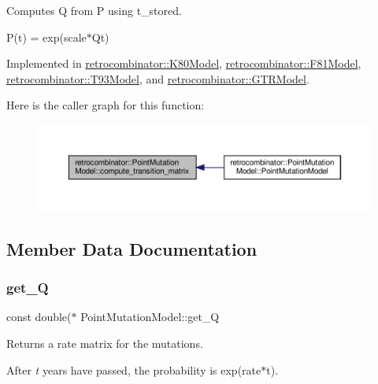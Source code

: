Computes Q from P using t\+\_\+stored. 

P(t) = exp(scale$\ast$\+Qt) 

Implemented in \hyperlink{classretrocombinator_1_1K80Model_a70f669e2a31d34a37b19fd185219a9ce}{retrocombinator\+::\+K80\+Model}, \hyperlink{classretrocombinator_1_1F81Model_a5bb9c63e55c4f8f7b9573281ff6ee610}{retrocombinator\+::\+F81\+Model}, \hyperlink{classretrocombinator_1_1T93Model_aaa8c96927a1ff3b8c611f0d0f9d6f36a}{retrocombinator\+::\+T93\+Model}, and \hyperlink{classretrocombinator_1_1GTRModel_a7d71f990fd33bcb7fc6a74accf03d7ae}{retrocombinator\+::\+G\+T\+R\+Model}.

Here is the caller graph for this function\+:\nopagebreak
\begin{figure}[H]
\begin{center}
\leavevmode
\includegraphics[width=350pt]{classretrocombinator_1_1PointMutationModel_a29357db0a7cfb35ab1540840aa4cfda1_icgraph}
\end{center}
\end{figure}


\subsection{Member Data Documentation}
\mbox{\label{classretrocombinator_1_1PointMutationModel_a6c6e94bfbf16c3893068e3db1597e941}} 
\subsubsection{\texorpdfstring{get\+\_\+Q}{get\_Q}}
{\footnotesize\ttfamily const double($\ast$ Point\+Mutation\+Model\+::get\+\_\+Q}



Returns a rate matrix for the mutations. 

After {\itshape t} years have passed, the probability is exp(rate$\ast$t). \mbox{\label{classretrocombinator_1_1PointMutationModel_a5f17e2f93b22723721a4d04ac2c77aaa}} 
